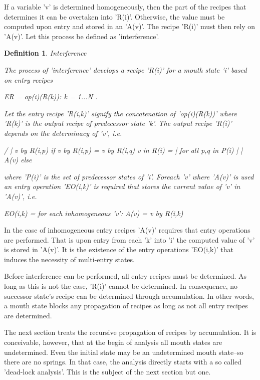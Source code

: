 \documentclass[12pt]{article}
\newtheorem{definition}{Definition}
\begin{document}
If a variable 'v' is determined homogeneously, then the part of the recipes
that determines it can be overtaken into 'R(i)'. Otherwise, the value must be
computed upon entry and stored in an 'A(v)'. The recipe 'R(i)' must then rely
on 'A(v)'. Let this process be defined as 'interference'.

\begin{definition}
Interference

The process of 'interference' develops a recipe 'R(i)' for a mouth state
'i' based on entry recipes 

              ER = { op(i)(R(k)): k = 1...N }. 
              
Let the entry recipe 'R(i,k)' signify the concatenation of 'op(i)(R(k))'
where 'R(k)' is the output recipe of predecessor state 'k'. The output
recipe 'R(i)' depends on the determinacy of 'v', i.e. 

                 /
                 |  v by R(i,p)   if v by R(i,p) = v by R(i,q) 
     v in R(i) = |                for all p,q in P(i)
                 |
                 |  A(v)          else
                 \

where 'P(i)' is the set of predecessor states of 'i'. Foreach 'v' where
'A(v)' is used an entry operation 'EO(i,k)' is required that stores
the current value of 'v' in 'A(v)', i.e.

     EO(i,k) = { for each inhomogeneous 'v': A(v) = v by R(i,k) }
\end{definition}

In the case of inhomogeneous entry recipes 'A(v)' requires that entry
operations are performed.  That is upon entry from each 'k' into 'i' the
computed value of 'v' is stored in 'A(v)'.  It is the existence of the entry
operations 'EO(i,k)' that induces the necessity of multi-entry states.  

Before interference can be performed, all entry recipes must be determined.  As
long as this is not the case, 'R(i)' cannot be determined. In consequence, no
successor state's recipe can be determined through accumulation. In other
words,  a mouth state blocks any propagation of recipes as long as not all
entry recipes are determined. 

The next section treats the recursive propagation of recipes by accumulation.
It is conceivable, however, that at the begin of analysis all mouth states are
undetermined. Even the initial state may be an undetermined mouth state--so
there are no springs. In that case, the analysis directly starts with a so
called 'dead-lock analysis'. This is the subject of the next section but one.
\end{document}

